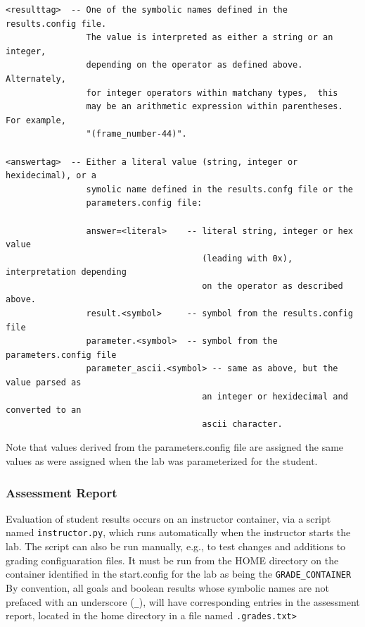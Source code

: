 \documentclass[12pt]{article}
\begin{document}
\begin{verbatim}
<resulttag>  -- One of the symbolic names defined in the results.config file.
                The value is interpreted as either a string or an integer,
                depending on the operator as defined above.  Alternately, 
                for integer operators within matchany types,  this
                may be an arithmetic expression within parentheses.  For example,
                "(frame_number-44)".
                
<answertag>  -- Either a literal value (string, integer or hexidecimal), or a 
                symolic name defined in the results.confg file or the 
                parameters.config file:
 
                answer=<literal>    -- literal string, integer or hex value 
                                       (leading with 0x), interpretation depending 
                                       on the operator as described above.
                result.<symbol>     -- symbol from the results.config file
                parameter.<symbol>  -- symbol from the parameters.config file
                parameter_ascii.<symbol> -- same as above, but the value parsed as 
                                       an integer or hexidecimal and converted to an 
                                       ascii character.

\end{verbatim}
         Note that values derived from the parameters.config file are assigned the same values as
         were assigned when the lab was parameterized for the student.

\subsubsection{Assessment Report}
Evaluation of student results occurs on an instructor container, via a script named {\tt instructor.py}, which runs
automatically when the instructor starts the lab.  The script can also be run manually, e.g., to
test changes and additions to grading configuaration files.  It must be run from the HOME directory
on the container identified in the start.config for the lab as being the {\tt GRADE\_CONTAINER}
By convention, all goals and boolean results whose symbolic names are not prefaced with an
underscore ({\tt\_}), will have corresponding entries in the assessment report, located in 
the home directory in a file named {\tt <lab name>.grades.txt>}
\end{document}

